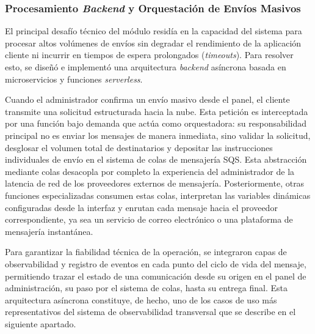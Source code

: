 \subsubsection{Procesamiento \textit{Backend} y Orquestación de Envíos Masivos}

El principal desafío técnico del módulo residía en la capacidad del sistema para procesar altos volúmenes de envíos sin degradar el rendimiento de la aplicación cliente ni incurrir en tiempos de espera prolongados (\textit{timeouts}). Para resolver esto, se diseñó e implementó una arquitectura \textit{backend} asíncrona basada en microservicios y funciones \textit{serverless}.

Cuando el administrador confirma un envío masivo desde el panel, el cliente transmite una solicitud estructurada hacia la nube. Esta petición es interceptada por una función bajo demanda que actúa como orquestadora: su responsabilidad principal no es enviar los mensajes de manera inmediata, sino validar la solicitud, desglosar el volumen total de destinatarios y depositar las instrucciones individuales de envío en el sistema de colas de mensajería SQS. Esta abstracción mediante colas desacopla por completo la experiencia del administrador de la latencia de red de los proveedores externos de mensajería. Posteriormente, otras funciones especializadas consumen estas colas, interpretan las variables dinámicas configuradas desde la interfaz y enrutan cada mensaje hacia el proveedor correspondiente, ya sea un servicio de correo electrónico o una plataforma de mensajería instantánea.

Para garantizar la fiabilidad técnica de la operación, se integraron capas de observabilidad y registro de eventos en cada punto del ciclo de vida del mensaje, permitiendo trazar el estado de una comunicación desde su origen en el panel de administración, su paso por el sistema de colas, hasta su entrega final. Esta arquitectura asíncrona constituye, de hecho, uno de los casos de uso más representativos del sistema de observabilidad transversal que se describe en el siguiente apartado.

